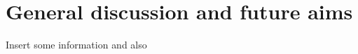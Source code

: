 \documentclass[../main.tex]{subfiles}
\begin{document}
\chapter{General discussion and future aims}
\label{cha:discussion}

Insert some information \cite{basselMulticellularSystemsBiology2019} and also \cite{hughesNonDestructiveHighContentAnalysis2017}
\end{document}
